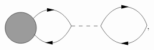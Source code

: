 \begin{equation}
\begin{gathered}
\begin{tikzpicture}[x=0.75pt,y=0.75pt,yscale=-1,xscale=1]
\draw  [fill={rgb, 255:red, 155; green, 155; blue, 155 }  ,fill opacity=1 ] (56,136) .. controls (56,122.19) and (67.19,111) .. (81,111) .. controls (94.81,111) and (106,122.19) .. (106,136) .. controls (106,149.81) and (94.81,161) .. (81,161) .. controls (67.19,161) and (56,149.81) .. (56,136) -- cycle ;
\draw    (101,121) .. controls (123,96) and (149,106) .. (162,133) ;
\draw    (103,147) .. controls (125,172) and (149,160) .. (162,133) ;
\draw    (135,107) ;
\draw [shift={(135,107)}, rotate = 180] [fill={rgb, 255:red, 0; green, 0; blue, 0 }  ][line width=0.08]  [draw opacity=0] (12,-3) -- (0,0) -- (12,3) -- cycle    ;
\draw    (129,160) -- (122,160) ;
\draw [shift={(120,160)}, rotate = 360] [fill={rgb, 255:red, 0; green, 0; blue, 0 }  ][line width=0.08]  [draw opacity=0] (12,-3) -- (0,0) -- (12,3) -- cycle    ;
\draw    (209,133) .. controls (230,87) and (272,97) .. (283,132) ;
\draw    (209,133) .. controls (233,177) and (271,165) .. (283,132) ;
\draw    (254,102) ;
\draw [shift={(254,102)}, rotate = 180] [fill={rgb, 255:red, 0; green, 0; blue, 0 }  ][line width=0.08]  [draw opacity=0] (12,-3) -- (0,0) -- (12,3) -- cycle    ;
\draw    (250,161) -- (243,161) ;
\draw [shift={(241,161)}, rotate = 360] [fill={rgb, 255:red, 0; green, 0; blue, 0 }  ][line width=0.08]  [draw opacity=0] (12,-3) -- (0,0) -- (12,3) -- cycle    ;
\draw  [dash pattern={on 4.5pt off 4.5pt}]  (162,133) -- (209,133) ;
\end{tikzpicture}
    \end{gathered},
    \label{eq:eom-rpa-diagram}
\end{equation}